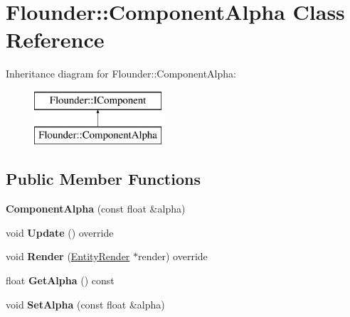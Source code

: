 \hypertarget{class_flounder_1_1_component_alpha}{}\section{Flounder\+:\+:Component\+Alpha Class Reference}
\label{class_flounder_1_1_component_alpha}
Inheritance diagram for Flounder\+:\+:Component\+Alpha\+:\begin{figure}[H]
\begin{center}
\leavevmode
\includegraphics[height=2.000000cm]{class_flounder_1_1_component_alpha}
\end{center}
\end{figure}
\subsection*{Public Member Functions}
\begin{DoxyCompactItemize}
\item 
\mbox{\label{class_flounder_1_1_component_alpha_a3cb6061ac86b81e3e92c90fe4f3d7bb2}} 
{\bfseries Component\+Alpha} (const float \&alpha)
\item 
\mbox{\label{class_flounder_1_1_component_alpha_a69f56714a5176f785f2b52b4fa684e9e}} 
void {\bfseries Update} () override
\item 
\mbox{\label{class_flounder_1_1_component_alpha_aa374dc199733273a0a829de1cee42f4b}} 
void {\bfseries Render} (\hyperlink{struct_flounder_1_1_entity_render}{Entity\+Render} $\ast$render) override
\item 
\mbox{\label{class_flounder_1_1_component_alpha_a9a4980b92d2c9719208f939a89d20148}} 
float {\bfseries Get\+Alpha} () const
\item 
\mbox{\label{class_flounder_1_1_component_alpha_af7a5f8e901ef44709d2848835cb469c1}} 
void {\bfseries Set\+Alpha} (const float \&alpha)
\end{DoxyCompactItemize}

